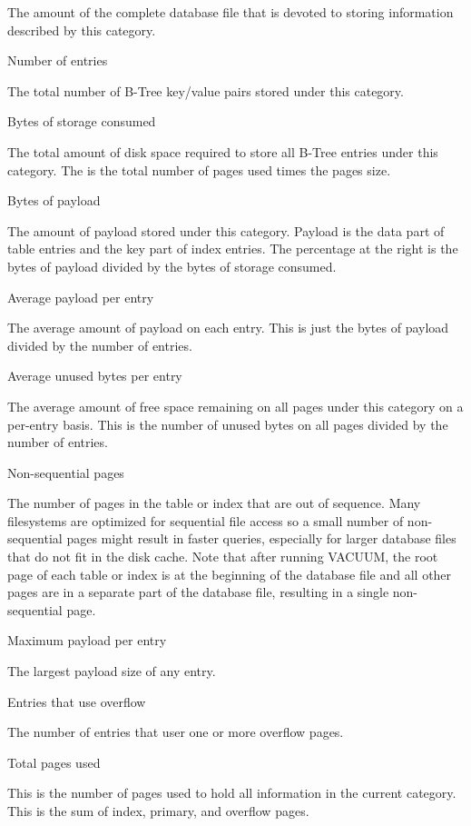     The amount of the complete database file that is devoted to storing
    information described by this category.

Number of entries

    The total number of B-Tree key/value pairs stored under this category.

Bytes of storage consumed

    The total amount of disk space required to store all B-Tree entries
    under this category.  The is the total number of pages used times
    the pages size.

Bytes of payload

    The amount of payload stored under this category.  Payload is the data
    part of table entries and the key part of index entries.  The percentage
    at the right is the bytes of payload divided by the bytes of storage 
    consumed.

Average payload per entry

    The average amount of payload on each entry.  This is just the bytes of
    payload divided by the number of entries.

Average unused bytes per entry

    The average amount of free space remaining on all pages under this
    category on a per-entry basis.  This is the number of unused bytes on
    all pages divided by the number of entries.

Non-sequential pages

    The number of pages in the table or index that are out of sequence.
    Many filesystems are optimized for sequential file access so a small
    number of non-sequential pages might result in faster queries,
    especially for larger database files that do not fit in the disk cache.
    Note that after running VACUUM, the root page of each table or index is
    at the beginning of the database file and all other pages are in a
    separate part of the database file, resulting in a single non-
    sequential page.

Maximum payload per entry

    The largest payload size of any entry.

Entries that use overflow

    The number of entries that user one or more overflow pages.

Total pages used

    This is the number of pages used to hold all information in the current
    category.  This is the sum of index, primary, and overflow pages.

